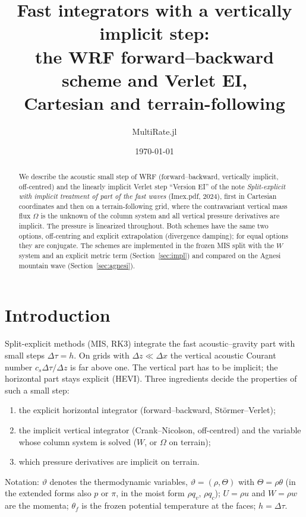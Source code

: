 \documentclass[11pt,a4paper]{article}
\title{Fast integrators with a vertically implicit step:\\
the WRF forward--backward scheme and Verlet EI,\\ Cartesian and terrain-following}
\author{MultiRate.jl}
\date{\today}
\newcommand{\dtau}{\Delta\tau}
\newcommand{\tv}{\vartheta}   %
\begin{document}
\maketitle

\begin{abstract}
We describe the acoustic small step of WRF (forward--backward, vertically implicit,
off-centred) and the linearly implicit Verlet step ``Version EI'' of the note \emph{Split-explicit
with implicit treatment of part of the fast waves} (Imex.pdf, 2024), first in Cartesian
coordinates and then on a terrain-following grid, where the contravariant vertical mass flux
$\Omega$ is the unknown of the column system and all vertical pressure derivatives are implicit.
The pressure is linearized throughout. Both schemes have the same two options, off-centring and
explicit extrapolation (divergence damping); for equal options they are conjugate. The schemes
are implemented in the frozen MIS split with the $W$ system and an explicit metric term
(Section~\ref{sec:impl}) and compared on the Agnesi mountain wave (Section~\ref{sec:agnesi}).
\end{abstract}

\tableofcontents

\section{Introduction}
Split-explicit methods (MIS, RK3) integrate the fast acoustic--gravity part with small steps
$\dtau=h$. On grids with $\Delta z\ll\Delta x$ the vertical acoustic Courant number
$c_s\dtau/\Delta z$ is far above one. The vertical part has to be implicit; the horizontal
part stays explicit (HEVI). Three ingredients decide the properties of such a small step:
\begin{enumerate}
\item the explicit horizontal integrator (forward--backward, Störmer--Verlet);
\item the implicit vertical integrator (Crank--Nicolson, off-centred) and the variable whose
column system is solved ($W$, or $\Omega$ on terrain);
\item which pressure derivatives are implicit on terrain.
\end{enumerate}
Notation: $\tv$ denotes the thermodynamic variables, $\tv=(\rho,\Theta)$ with $\Theta=\rho\theta$ (in the extended
forms also $p$ or $\pi$, in the moist form $\rho q_v$, $\rho q_c$); $U=\rho u$ and $W=\rho w$ are the momenta;
$\theta_f$ is the frozen potential temperature at the faces; $h=\dtau$.
\end{document}
